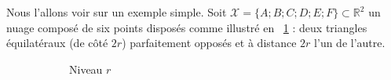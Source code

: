 Nous l'allons voir sur un exemple simple. Soit $\mathcal X = \bigl\{ A ; B ; C ; D ; E ; F\bigr\} \subset \mathbb R^2$ un nuage composé de six points disposés comme illustré en \Fig~\ref{fig:nuage} : deux triangles équilatéraux (de côté $2r$) parfaitement opposés et à distance $2r$ l'un de l'autre.


\begin{figure}[htbp]
    \centering
    
    \begin{subfigure}[b]{0.48\textwidth}
        \centering
        \caption{Niveau $r$}
        \label{fig:nuage}
    \end{subfigure}
    \hfill
    \begin{subfigure}[b]{0.48\textwidth}
        \centering
\end{subfigure}
\end{figure}
